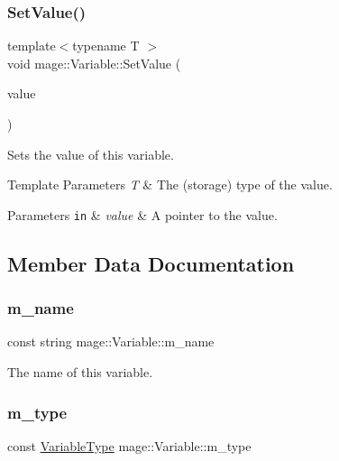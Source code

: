 \subsubsection{\texorpdfstring{Set\+Value()}{SetValue()}}
{\footnotesize\ttfamily template$<$typename T $>$ \\
void mage\+::\+Variable\+::\+Set\+Value (\begin{DoxyParamCaption}\item[{const T $\ast$}]{value }\end{DoxyParamCaption})}

Sets the value of this variable.


\begin{DoxyTemplParams}{Template Parameters}
{\em T} & The (storage) type of the value. \\
\hline
\end{DoxyTemplParams}

\begin{DoxyParams}[1]{Parameters}
\mbox{\tt in}  & {\em value} & A pointer to the value. \\
\hline
\end{DoxyParams}


\subsection{Member Data Documentation}
\hypertarget{structmage_1_1_variable_afac262aa51bb1dfe447d501abcaa08d0}{}\label{structmage_1_1_variable_afac262aa51bb1dfe447d501abcaa08d0} 
\subsubsection{\texorpdfstring{m\+\_\+name}{m\_name}}
{\footnotesize\ttfamily const string mage\+::\+Variable\+::m\+\_\+name\hspace{0.3cm}{\ttfamily [private]}}

The name of this variable. \hypertarget{structmage_1_1_variable_acb45a61a0690e0efac614915595c4449}{}\label{structmage_1_1_variable_acb45a61a0690e0efac614915595c4449} 
\subsubsection{\texorpdfstring{m\+\_\+type}{m\_type}}
{\footnotesize\ttfamily const \hyperlink{namespacemage_a530428e73bac0ba7fe84b29086a9e33a}{Variable\+Type} mage\+::\+Variable\+::m\+\_\+type\hspace{0.3cm}{\ttfamily [private]}}

